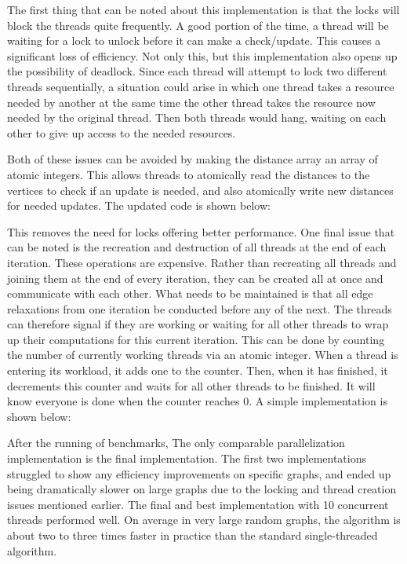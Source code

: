 \documentclass[conference]{IEEEtran}
\begin{document}
The first thing that can be noted about this implementation is that the locks will block the threads quite frequently. A good portion of the time, a thread will be waiting for a lock to unlock before it can make a check/update. This causes a significant loss of efficiency. Not only this, but this implementation also opens up the possibility of deadlock. Since each thread will attempt to lock two different threads sequentially, a situation could arise in which one thread takes a resource needed by another at the same time the other thread takes the resource now needed by the original thread. Then both threads would hang, waiting on each other to give up access to the needed resources.

Both of these issues can be avoided by making the distance array an array of atomic integers. This allows threads to atomically read the distances to the vertices to check if an update is needed, and also atomically write new distances for needed updates. The updated code is shown below:



This removes the need for locks offering better performance. One final issue that can be noted is the recreation and destruction of all threads at the end of each iteration. These operations are expensive. Rather than recreating all threads and joining them at the end of every iteration, they can be created all at once and communicate with each other. What needs to be maintained is that all edge relaxations from one iteration be conducted before any of the next. The threads can therefore signal if they are working or waiting for all other threads to wrap up their computations for this current iteration. This can be done by counting the number of currently working threads via an atomic integer. When a thread is entering its workload, it adds one to the counter. Then, when it has finished, it decrements this counter and waits for all other threads to be finished. It will know everyone is done when the counter reaches 0. A simple implementation is shown below:





After the running of benchmarks, The only comparable parallelization implementation is the final implementation. The first two implementations struggled to show any efficiency improvements on specific graphs, and ended up being dramatically slower on large graphs due to the locking and thread creation issues mentioned earlier. The final and best implementation with 10 concurrent threads performed well. On average in very large random graphs, the algorithm is about two to three times faster in practice than the standard single-threaded algorithm.
\end{document}
